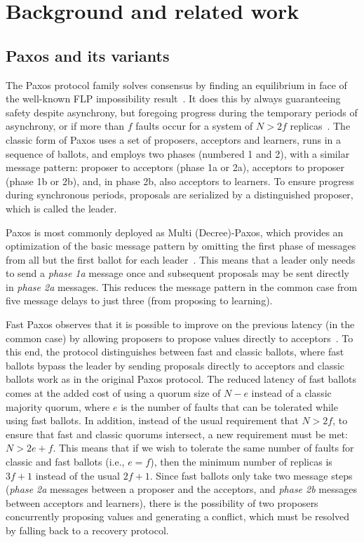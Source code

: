 \section{Background and related work}
\label{sec:related} 
\subsection{Paxos and its variants} \label{Paxos} 

The Paxos protocol family solves consensus by finding an equilibrium in face of the well-known FLP impossibility result~\cite{FLP85}. It does this by always guaranteeing safety despite asynchrony, but
foregoing progress during the temporary periods of asynchrony, or if more than $f$ faults occur for a system of $N > 2f$ replicas~\cite{L01}. The classic form of Paxos uses a set of proposers, acceptors and learners, runs in a sequence of ballots, and employs two phases (numbered 1 and 2), with a similar message pattern: proposer to acceptors (phase 1a or 2a), acceptors to proposer (phase 1b or 2b), and, in phase 2b, also acceptors to learners. To ensure progress during synchronous periods, proposals are serialized by a distinguished proposer, which is called the leader.\par
Paxos is most commonly deployed as Multi (Decree)-Paxos, which provides an optimization of the basic message pattern by omitting the first phase of messages from all but the first ballot for each leader~\cite{Renesse2011}. This means that a leader only needs to send a \textit{phase 1a} message once and subsequent proposals may be sent directly in \textit{phase 2a} messages. This reduces the message pattern in the common case from five message delays to just three (from proposing to learning). \par
Fast Paxos observes that it is possible to improve on the previous latency (in the common case) by allowing proposers to propose values directly to acceptors~\cite{L06}. To this end, the protocol distinguishes between fast and classic ballots, where fast ballots bypass the leader by sending proposals directly to acceptors and classic ballots work as in the original Paxos protocol. The reduced latency of fast ballots comes at the added cost of using a quorum size of $N-e$ instead of a classic majority quorum, where $e$ is the number of faults that can be tolerated while using fast ballots. In addition, instead of the usual requirement that $N> 2f$, to ensure that fast and classic quorums intersect, a new requirement must be met: $N > 2e+f$. This means that if we wish to tolerate the same number of faults for classic and fast ballots (i.e., $e=f$), then the minimum number of replicas is $3f+1$ instead of the usual $2f+1$. Since fast ballots only take two message steps (\textit{phase 2a} messages between a proposer and the acceptors, and \textit{phase 2b} messages between acceptors and learners), there is the possibility of two proposers concurrently proposing values and generating a conflict, which must be resolved by falling back to a recovery protocol. \par
